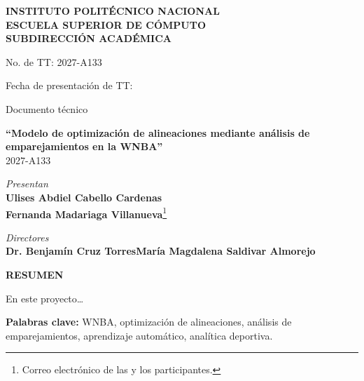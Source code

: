 \documentclass[12pt,letterpaper]{report}
\newcommand{\tituloTT}{Modelo de optimización de alineaciones mediante análisis de emparejamientos en la WNBA}
\newcommand{\numeroTT}{2027-A133}
\newcommand{\autorUno}{Ulises Abdiel Cabello Cardenas}
\newcommand{\autorDos}{Fernanda Madariaga Villanueva}
\newcommand{\directorUno}{Dr. Benjamín Cruz Torres}
\newcommand{\directorDos}{María Magdalena Saldivar Almorejo}
\begin{document}
\begin{titlepage}
\begin{center}
{\bfseries INSTITUTO POLITÉCNICO NACIONAL}\\
{\bfseries ESCUELA SUPERIOR DE CÓMPUTO}\\
{\bfseries SUBDIRECCIÓN ACADÉMICA}
\end{center}

\vspace{0.5cm}
\noindent
\begin{minipage}[t]{0.5\textwidth}
    No. de TT: \numeroTT
\end{minipage}
\begin{minipage}[t]{0.45\textwidth}
    \raggedleft Fecha de presentación de TT: \underline{\hspace{4cm}}
\end{minipage}

\vspace{0.3cm}
\begin{center}
    Documento técnico

    \vspace{0.5cm}
    {\bfseries ``\tituloTT''}\\
    \numeroTT

    \vspace{0.5cm}
    \textit{Presentan}\\
    \textbf{\autorUno}\\
    \textbf{\autorDos}\footnote{Correo electrónico de las y los participantes.}

    \vspace{0.5cm}
    \textit{Directores}\\
    \textbf{\directorUno \quad \directorDos}
\end{center}

\vspace{0.5cm}
\begin{center}
    \textbf{RESUMEN}
\end{center}
\noindent
En este proyecto\ldots

\vspace{0.5cm}
\noindent \textbf{Palabras clave:} WNBA, optimización de alineaciones, análisis de emparejamientos, aprendizaje automático, analítica deportiva.

\end{titlepage}
\end{document}
